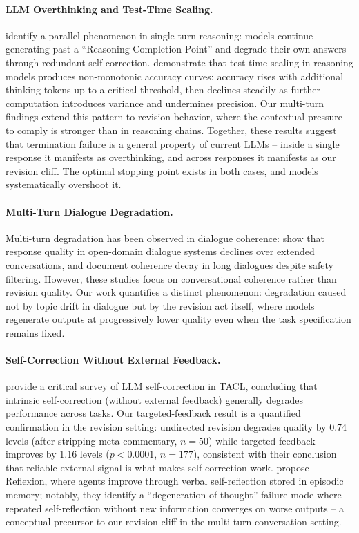 \paragraph{LLM Overthinking and Test-Time Scaling.}
\citet{chen2025overthinking} identify a parallel phenomenon in single-turn reasoning: models continue generating past a ``Reasoning Completion Point'' and degrade their own answers through redundant self-correction. \citet{ghosal2025overthinking} demonstrate that test-time scaling in reasoning models produces non-monotonic accuracy curves: accuracy rises with additional thinking tokens up to a critical threshold, then declines steadily as further computation introduces variance and undermines precision. Our multi-turn findings extend this pattern to revision behavior, where the contextual pressure to comply is stronger than in reasoning chains. Together, these results suggest that termination failure is a general property of current LLMs -- inside a single response it manifests as overthinking, and across responses it manifests as our revision cliff. The optimal stopping point exists in both cases, and models systematically overshoot it.

\paragraph{Multi-Turn Dialogue Degradation.}
Multi-turn degradation has been observed in dialogue coherence: \citet{zhang2020dialogpt} show that response quality in open-domain dialogue systems declines over extended conversations, and \citet{thoppilan2022lamda} document coherence decay in long dialogues despite safety filtering. However, these studies focus on conversational coherence rather than revision quality. Our work quantifies a distinct phenomenon: degradation caused not by topic drift in dialogue but by the revision act itself, where models regenerate outputs at progressively lower quality even when the task specification remains fixed.

\paragraph{Self-Correction Without External Feedback.}
\citet{kamoi2024selfcorrection} provide a critical survey of LLM self-correction in TACL, concluding that intrinsic self-correction (without external feedback) generally degrades performance across tasks. Our targeted-feedback result is a quantified confirmation in the revision setting: undirected revision degrades quality by 0.74 levels (after stripping meta-commentary, $n = 50$) while targeted feedback improves by 1.16 levels ($p < 0.0001$, $n = 177$), consistent with their conclusion that reliable external signal is what makes self-correction work. \citet{shinn2023reflexion} propose Reflexion, where agents improve through verbal self-reflection stored in episodic memory; notably, they identify a ``degeneration-of-thought'' failure mode where repeated self-reflection without new information converges on worse outputs -- a conceptual precursor to our revision cliff in the multi-turn conversation setting.

